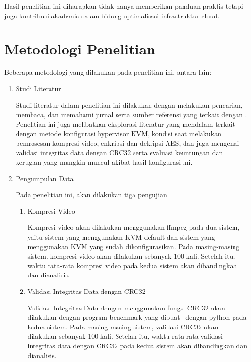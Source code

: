 Hasil penelitian ini diharapkan tidak hanya memberikan panduan praktis tetapi juga kontribusi akademis dalam bidang optimalisasi infrastruktur cloud.

\section{Metodologi Penelitian}
Beberapa metodologi yang dilakukan pada penelitian ini, antara lain:
\begin{enumerate}
      \item Studi Literatur

            Studi literatur dalam penelitian ini dilakukan dengan melakukan pencarian, membaca, dan memahami jurnal serta sumber referensi yang terkait dengan \cc. Penelitian ini juga melibatkan eksplorasi literatur yang mendalam terkait dengan metode konfigurasi hypervisor KVM, kondisi saat melakukan pemrosesan kompresi video, enkripsi dan dekripsi AES, dan juga mengenai validasi integritas data dengan CRC32 serta evaluasi keuntungan dan kerugian yang mungkin muncul akibat hasil konfigurasi ini.

      \item Pengumpulan Data

            Pada penelitian ini, akan dilakukan tiga pengujian
            \begin{enumerate}
                  \item Kompresi Video

                        Kompresi video akan dilakukan menggunakan ffmpeg pada dua sistem, yaitu sistem yang menggunakan KVM default dan sistem yang menggunakan KVM yang sudah dikonfigurasikan. Pada masing-masing sistem, kompresi video akan dilakukan sebanyak 100 kali. Setelah itu, waktu rata-rata kompresi video pada kedua sistem akan dibandingkan dan dianalisis.

                  \item Validasi Integritas Data dengan CRC32

                        Validasi Integritas Data dengan menggunakan fungsi CRC32 akan dilakukan dengan program benchmark yang dibuat \saya\ dengan python pada kedua sistem. Pada masing-masing sistem, validasi CRC32 akan dilakukan sebanyak 100 kali. Setelah itu, waktu rata-rata validasi integritas data dengan CRC32 pada kedua sistem akan dibandingkan dan dianalisis.


\end{enumerate}
\end{enumerate}
